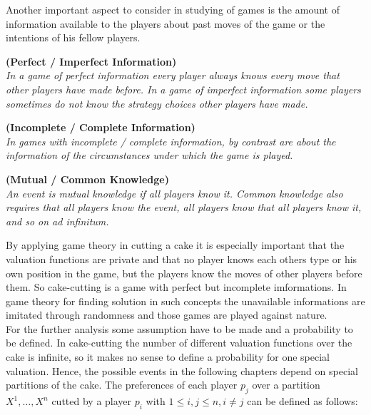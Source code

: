 \newline
Another important aspect to consider in studying of games is the amount of information available to the players about past moves of the game or the intentions of his fellow players. 
\begin{defi}{\textbf{(Perfect / Imperfect Information)}}\\
\emph{In a game of \emph{perfect information} every player always knows every move that other players have made before. In a game of \emph{imperfect information} some players sometimes do not know the strategy choices other players have made.}
\end{defi}
\begin{defi}{\textbf{(Incomplete / Complete Information)}}\\
\emph{In games with \emph{incomplete / complete information}, by contrast are about the information of the circumstances under which the game is played.}
\end{defi}
\begin{defi}{\textbf{(Mutual / Common Knowledge)}}\\
\emph{An event is \emph{mutual knowledge} if all players know it. \emph{Common knowledge} also requires that all players know the event, all players know that all players know it, and so on ad infinitum.}
\end{defi}
By applying game theory in cutting a cake it is especially important that the valuation functions are private and that no player knows each others type or his own position in the game, but the players know the moves of other players before them. So cake-cutting is a game with perfect but incomplete imformations. In game theory for finding solution in such concepts the unavailable informations are imitated through randomness and those games are played against nature.\\For the further analysis some assumption have to be made and a probability to be defined. In cake-cutting the number of different valuation functions over the cake is infinite, so it makes no sense to define a probability for one special valuation. Hence, the possible events in the following chapters depend on special partitions of the cake. The preferences of each player $p_j$ over a partition $X^1, \ldots, X^n$ cutted by a player $p_i$ with $1 \leq i,j \leq n, i \neq j$ can be defined as follows:    
